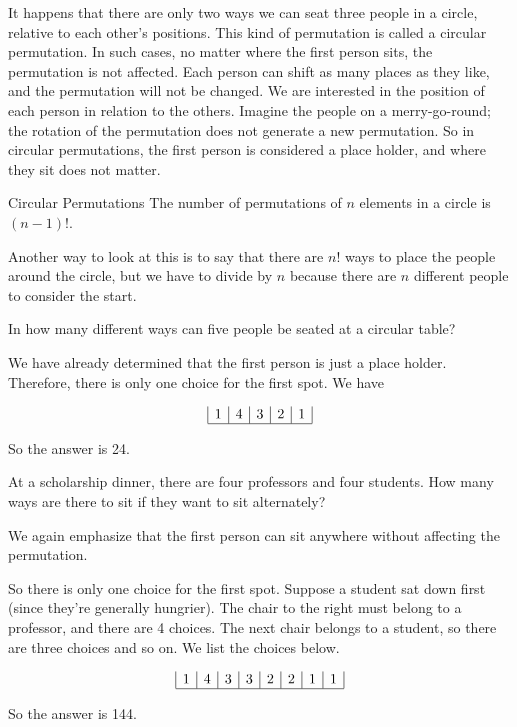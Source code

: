 It happens that there are only two ways we can seat three people in a circle, relative to each other’s positions. This kind of permutation is called a circular permutation. In such cases, no matter where the first person sits, the permutation is not affected. Each person can shift as many places as they like, and the permutation will not be changed. We are interested in the position of each person in relation to the others. Imagine the people on a merry-go-round; the rotation of the permutation does not generate a new permutation. So in circular permutations, the first person is considered a place holder, and where they sit does not matter.

\begin{summarybox}{Circular Permutations}
    The number of permutations of \( n \) elements in a circle is \( (n-1)! \).
\end{summarybox}

Another way to look at this is to say that there are $n!$ ways to place the people around the circle, but we have to divide by $n$ because there are $n$ different people to consider the start.

\begin{example}
    In how many different ways can five people be seated at a circular table?
\end{example}

\begin{solution}
    We have already determined that the first person is just a place holder. Therefore, there is only one choice for the first spot. We have

    \[
        \begin{array}{|c|c|c|c|c|}
            1 & 4 & 3 & 2 & 1 \\
            \hline
        \end{array}
    \]

    So the answer is 24.
\end{solution}

\begin{example}
    At a scholarship dinner, there are four professors and four students. How many ways are there to sit if they want to sit alternately?
\end{example}

\begin{solution}
    We again emphasize that the first person can sit anywhere without affecting the permutation.

    So there is only one choice for the first spot. Suppose a student sat down first (since they're generally hungrier). The chair to the right must belong to a professor, and there are 4 choices. The next chair belongs to a student, so there are three choices and so on. We list the choices below.

    \[
        \begin{array}{|c|c|c|c|c|c|c|c|}
            1 & 4 & 3 & 3 & 2 & 2 & 1 & 1 \\
            \hline
        \end{array}
    \]

    So the answer is 144.
\end{solution}

